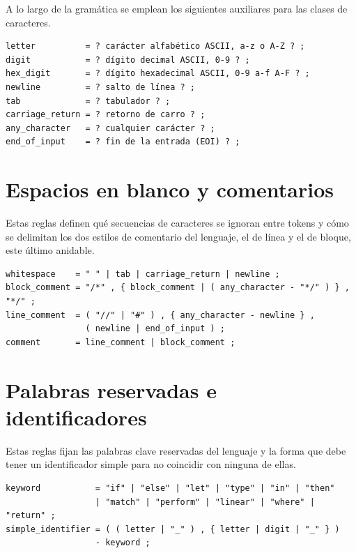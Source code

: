 A lo largo de la gramática se emplean los siguientes auxiliares para las clases de caracteres.

\begin{lstlisting}[language={}, caption=Clases de caracteres auxiliares]
letter          = ? carácter alfabético ASCII, a-z o A-Z ? ;
digit           = ? dígito decimal ASCII, 0-9 ? ;
hex_digit       = ? dígito hexadecimal ASCII, 0-9 a-f A-F ? ;
newline         = ? salto de línea ? ;
tab             = ? tabulador ? ;
carriage_return = ? retorno de carro ? ;
any_character   = ? cualquier carácter ? ;
end_of_input    = ? fin de la entrada (EOI) ? ;
\end{lstlisting}

\section{Espacios en blanco y comentarios}
\label{sec:ebnf-espacios}

Estas reglas definen qué secuencias de caracteres se ignoran entre tokens y cómo se delimitan los dos estilos de comentario del lenguaje, el de línea y el de bloque, este último anidable.

\begin{lstlisting}[language={}, caption=Reglas de espacios en blanco y comentarios]
whitespace    = " " | tab | carriage_return | newline ;
block_comment = "/*" , { block_comment | ( any_character - "*/" ) } , "*/" ;
line_comment  = ( "//" | "#" ) , { any_character - newline } ,
                ( newline | end_of_input ) ;
comment       = line_comment | block_comment ;
\end{lstlisting}

\section{Palabras reservadas e identificadores}
\label{sec:ebnf-identificadores}

Estas reglas fijan las palabras clave reservadas del lenguaje y la forma que debe tener un identificador simple para no coincidir con ninguna de ellas.

\begin{lstlisting}[language={}, caption=Reglas de palabras reservadas e identificadores]
keyword           = "if" | "else" | "let" | "type" | "in" | "then"
                  | "match" | "perform" | "linear" | "where" | "return" ;
simple_identifier = ( ( letter | "_" ) , { letter | digit | "_" } )
                  - keyword ;
\end{lstlisting}

